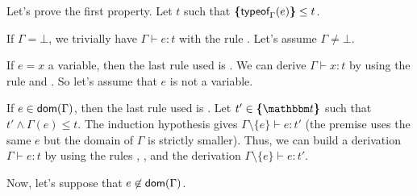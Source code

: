 \documentclass[a4paper]{article}
\theoremstyle{definition}
\begin{document}
  Let's prove the first property.
  Let $t$ such that $\textbf{\textup{\{}}\textsf{typeof}_{\Gamma}(e)\textbf{\textup{\}}} \leq t$.

  If $\Gamma = \bot$, we trivially have $\Gamma \vdash e:t$ with the rule .
  Let's assume $\Gamma \neq \bot$.

  If $e=x$ a variable, then the last rule used is .
  We can derive $\Gamma \vdash x:t$ by using the rule  and .
  So let's assume that $e$ is not a variable.

  If $e\in\textsf{dom}(\Gamma)$, then the last rule used is .
  Let $t'\in\tsint{\ts}$ such that $t'\land\Gamma(e)\leq t$.
  The induction hypothesis gives $\Gamma\setminus\{e\} \vdash e:t'$
  (the premise uses the same $e$ but the domain of $\Gamma$ is strictly smaller).
  Thus, we can build a derivation $\Gamma \vdash e:t$ by using the rules , ,
   and the derivation $\Gamma\setminus\{e\} \vdash e:t'$.

  Now, let's suppose that $e\not\in\textsf{dom}(\Gamma)$.
\end{document}

